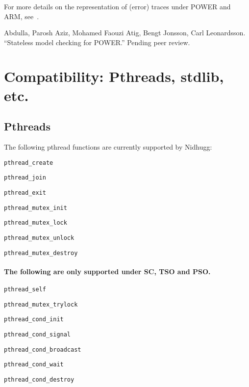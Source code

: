 \documentclass[a4paper]{article}
\begin{document}
For more details on the representation of (error) traces under POWER
and ARM, see~\cite{leonardssonRSMCPOWER}.

\begin{thebibliography}{99}
  Abdulla, Parosh Aziz, Mohamed Faouzi Atig, Bengt Jonsson, Carl Leonardsson. ``Stateless model checking for POWER.'' Pending peer review.
\end{thebibliography}

\section{Compatibility: Pthreads, stdlib, etc.}

\subsection{Pthreads}

The following pthread functions are currently supported by Nidhugg:

\begin{description}
\item{\texttt{pthread\_create}}
\item{\texttt{pthread\_join}}
\item{\texttt{pthread\_exit}}
\item{\texttt{pthread\_mutex\_init}}
\item{\texttt{pthread\_mutex\_lock}}
\item{\texttt{pthread\_mutex\_unlock}}
\item{\texttt{pthread\_mutex\_destroy}}
\end{description}

\paragraph{The following are only supported under SC, TSO and PSO.}

\begin{description}
\item{\texttt{pthread\_self}}
\item{\texttt{pthread\_mutex\_trylock}}
\item{\texttt{pthread\_cond\_init}}
\item{\texttt{pthread\_cond\_signal}}
\item{\texttt{pthread\_cond\_broadcast}}
\item{\texttt{pthread\_cond\_wait}}
\item{\texttt{pthread\_cond\_destroy}}
\end{description}
\end{document}
